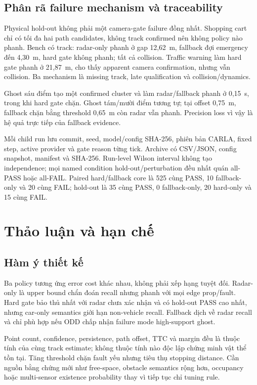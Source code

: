 \documentclass[conference]{IEEEtran}
\begin{document}
\subsection{Phân rã failure mechanism và traceability}
Physical hold-out không phải một camera-gate failure đồng nhất. Shopping cart
chỉ có tối đa hai path candidates, không track confirmed nên không policy nào
phanh. Bench có track: radar-only phanh ở gap 12,62~m, fallback đợi emergency
đến 4,30~m, hard gate không phanh; tất cả collision. Traffic warning làm hard
gate phanh ở 21,87~m, cho thấy apparent camera confirmation, nhưng vẫn collision.
Ba mechanism là missing track, late qualification và collision/dynamics.

Ghost sáu điểm tạo một confirmed cluster và làm radar/fallback phanh ở 0,15~s,
trong khi hard gate chặn. Ghost tám/mười điểm tương tự; tại offset 0,75~m,
fallback chặn bằng threshold 0,65~m còn radar vẫn phanh. Precision loss vì vậy
là hệ quả trực tiếp của fallback evidence.

Mỗi child run lưu commit, seed, model/config SHA-256, phiên bản CARLA, fixed step,
active provider và gate reason từng tick. Archive có CSV/JSON, config snapshot,
manifest và SHA-256. Run-level Wilson interval không tạo independence; mọi named
condition hold-out/perturbation đều nhất quán all-PASS hoặc all-FAIL. Paired
hard/fallback core là 525 cùng PASS, 10 fallback-only và 20 cùng FAIL; hold-out
là 35 cùng PASS, 0 fallback-only, 20 hard-only và 15 cùng FAIL.

\section{Thảo luận và hạn chế}
\subsection{Hàm ý thiết kế}
Ba policy tương ứng error cost khác nhau, không phải xếp hạng tuyệt đối.
Radar-only là upper bound chẩn đoán recall nhưng phanh với mọi edge prop/fault.
Hard gate bảo thủ nhất với radar chưa xác nhận và có hold-out PASS cao nhất,
nhưng car-only semantics giới hạn non-vehicle recall. Fallback dịch về radar
recall và chỉ phù hợp nếu ODD chấp nhận failure mode high-support ghost.

Point count, confidence, persistence, path offset, TTC và margin đều là thuộc
tính của cùng track estimate; không thuộc tính nào độc lập chứng minh vật thể tồn
tại. Tăng threshold chặn fault yếu nhưng tiêu thụ stopping distance. Cần nguồn
bằng chứng mới như free-space, obstacle semantics rộng hơn, occupancy hoặc
multi-sensor existence probability thay vì tiếp tục chỉ tuning rule.
\end{document}
